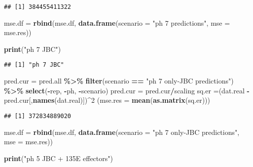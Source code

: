 \documentclass[
]{article}
\newenvironment{Shaded}{\begin{snugshade}}{\end{snugshade}}
\newcommand{\AttributeTok}[1]{\textcolor[rgb]{0.13,0.29,0.53}{#1}}
\newcommand{\DecValTok}[1]{\textcolor[rgb]{0.00,0.00,0.81}{#1}}
\newcommand{\FunctionTok}[1]{\textcolor[rgb]{0.13,0.29,0.53}{\textbf{#1}}}
\newcommand{\NormalTok}[1]{#1}
\newcommand{\OtherTok}[1]{\textcolor[rgb]{0.56,0.35,0.01}{#1}}
\newcommand{\SpecialCharTok}[1]{\textcolor[rgb]{0.81,0.36,0.00}{\textbf{#1}}}
\newcommand{\StringTok}[1]{\textcolor[rgb]{0.31,0.60,0.02}{#1}}
\begin{document}
\begin{verbatim}
## [1] 384455411322
\end{verbatim}

\begin{Shaded}
\begin{Highlighting}[]
\NormalTok{mse.df }\OtherTok{=} \FunctionTok{rbind}\NormalTok{(mse.df, }\FunctionTok{data.frame}\NormalTok{(}\AttributeTok{scenario =} \StringTok{"ph 7 predictions"}\NormalTok{,}
                                  \AttributeTok{mse =}\NormalTok{ mse.res))}


\FunctionTok{print}\NormalTok{(}\StringTok{"ph 7 JBC"}\NormalTok{)}
\end{Highlighting}
\end{Shaded}

\begin{verbatim}
## [1] "ph 7 JBC"
\end{verbatim}

\begin{Shaded}
\begin{Highlighting}[]
\NormalTok{pred.cur }\OtherTok{=}\NormalTok{ pred.all }\SpecialCharTok{\%\textgreater{}\%} 
  \FunctionTok{filter}\NormalTok{(scenario }\SpecialCharTok{==} \StringTok{"ph 7 only{-}JBC predictions"}\NormalTok{) }\SpecialCharTok{\%\textgreater{}\%} 
  \FunctionTok{select}\NormalTok{(}\SpecialCharTok{{-}}\NormalTok{rep, }\SpecialCharTok{{-}}\NormalTok{ph, }\SpecialCharTok{{-}}\NormalTok{scenario)}
\NormalTok{pred.cur }\OtherTok{=}\NormalTok{ pred.cur}\SpecialCharTok{/}\NormalTok{scaling}
\NormalTok{sq.er }\OtherTok{=}\NormalTok{(dat.real }\SpecialCharTok{{-}}\NormalTok{ pred.cur[,}\FunctionTok{names}\NormalTok{(dat.real)])}\SpecialCharTok{\^{}}\DecValTok{2}
\NormalTok{(}\AttributeTok{mse.res =} \FunctionTok{mean}\NormalTok{(}\FunctionTok{as.matrix}\NormalTok{(sq.er)))}
\end{Highlighting}
\end{Shaded}

\begin{verbatim}
## [1] 372834889020
\end{verbatim}

\begin{Shaded}
\begin{Highlighting}[]
\NormalTok{mse.df }\OtherTok{=} \FunctionTok{rbind}\NormalTok{(mse.df, }\FunctionTok{data.frame}\NormalTok{(}\AttributeTok{scenario =} \StringTok{"ph 7 only{-}JBC predictions"}\NormalTok{,}
                                  \AttributeTok{mse =}\NormalTok{ mse.res))}

\FunctionTok{print}\NormalTok{(}\StringTok{"ph 5 JBC + 135E effectors"}\NormalTok{)}
\end{Highlighting}
\end{Shaded}
\end{document}
